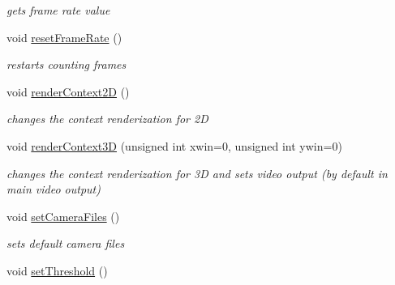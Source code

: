 \begin{DoxyCompactItemize}
\begin{DoxyCompactList}\small\item\em gets frame rate value \end{DoxyCompactList}\item 
\hypertarget{classavr_application_a554301792a3e5fc1b94a91a61f06c776}{void \hyperlink{classavr_application_a554301792a3e5fc1b94a91a61f06c776}{reset\-Frame\-Rate} ()}\label{classavr_application_a554301792a3e5fc1b94a91a61f06c776}

\begin{DoxyCompactList}\small\item\em restarts counting frames \end{DoxyCompactList}\item 
\hypertarget{classavr_application_a1a8ccf19884216cd20551209a8e2f467}{void \hyperlink{classavr_application_a1a8ccf19884216cd20551209a8e2f467}{render\-Context2\-D} ()}\label{classavr_application_a1a8ccf19884216cd20551209a8e2f467}

\begin{DoxyCompactList}\small\item\em changes the context renderization for 2\-D \end{DoxyCompactList}\item 
\hypertarget{classavr_application_a1877b70f4c21aef658da5b5d89949240}{void \hyperlink{classavr_application_a1877b70f4c21aef658da5b5d89949240}{render\-Context3\-D} (unsigned int xwin=0, unsigned int ywin=0)}\label{classavr_application_a1877b70f4c21aef658da5b5d89949240}

\begin{DoxyCompactList}\small\item\em changes the context renderization for 3\-D and sets video output (by default in main video output) \end{DoxyCompactList}\item 
\hypertarget{classavr_application_aee3a9519894f816f0629d6f7781427df}{void \hyperlink{classavr_application_aee3a9519894f816f0629d6f7781427df}{set\-Camera\-Files} ()}\label{classavr_application_aee3a9519894f816f0629d6f7781427df}

\begin{DoxyCompactList}\small\item\em sets default camera files \end{DoxyCompactList}\item 
\hypertarget{classavr_application_a398f541cc785cbedeaf18ff240d633a8}{void \hyperlink{classavr_application_a398f541cc785cbedeaf18ff240d633a8}{set\-Threshold} ()}\label{classavr_application_a398f541cc785cbedeaf18ff240d633a8}


\end{DoxyCompactItemize}
